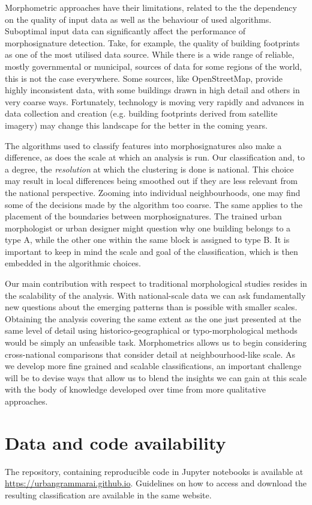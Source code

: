 Morphometric approaches have their limitations, related to the the dependency on the
quality of input data as well as the behaviour of used algorithms. Suboptimal
input data can significantly affect the performance of morphosignature detection. Take, for example,
the quality of building footprints as one of the most utilised data source. While there
is a wide range of reliable, mostly governmental or municipal, sources of data
for some regions of the world, this is not the case everywhere. Some sources, like OpenStreetMap, provide highly
inconsistent data, with some buildings drawn in high detail and others in very
coarse ways. Fortunately, technology is moving very rapidly and advances in
data collection and creation (e.g. building footprints derived from satellite
imagery) may change this landscape for the better in the coming years.

The algorithms used to classify features into morphosignatures also make a
difference, as does the scale at which an analysis is run.
Our classification and, to a degree, the
\textit{resolution} at which the clustering is done is national. This choice may result in local
differences being smoothed out if they are less relevant from the national
perspective. Zooming into individual neighbourhoods, one may find some of the
decisions made by the algorithm too coarse. The same applies to the placement of the boundaries between morphosignatures.
The trained urban morphologist or urban designer might question why one building
belongs to a type A, while the other one within the same block is assigned to
type B. It is important to
keep in mind the scale and goal of the classification, which is then embedded
in the algorithmic choices.

Our main contribution with respect to traditional
morphological studies resides in the scalability of the analysis. With national-scale data we can ask
fundamentally new questions about the emerging patterns than is possible with
smaller scales. Obtaining the analysis covering
the same extent as the one just presented at the same level of detail using
historico-geographical or typo-morphological methods would be simply an unfeasible task.
Morphometrics allows us to begin considering cross-national comparisons that
consider detail at neighbourhood-like scale.
%
As we develop more fine grained and scalable classifications, an
important challenge will be to devise ways that allow us to blend the
insights we can gain at this scale with the body of knowledge developed over
time from more qualitative approaches.

\section{Data and code availability}
The repository, containing reproducible code in Jupyter notebooks is available at
\url{https://urbangrammarai.github.io}. Guidelines on how to access and
download the resulting classification are available in the same website.
